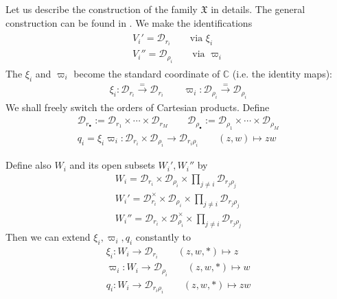 \documentclass[11pt,b5paper,notitlepage]{article}
\theoremstyle{definition}
\theoremstyle{plain}
\newcommand{\mc}{\mathcal}
\newcommand{\wht}{\widehat}
\newcommand{\blt}{\bullet}
\newcommand{\Cbb}{\mathbb C}
\newcommand{\<}{\left\langle}
\renewcommand{\>}{\right\rangle}
\newcommand{\fx}{\mathfrak{X}}
\newcommand{\MD}{\mathcal{D}}
\numberwithin{equation}{section}
\begin{document}
Let us describe the construction of the family $\fx$ in details. The general construction can be found in \cite[Sec. 3]{Gui-sewingconvergence}. We make the identifications
\begin{gather}\label{eq22}
\begin{gathered}
V_i'=\mc D_{r_i}\qquad \text{via }\xi_i\\
V_i''=\mc D_{\rho_i}\qquad \text{via }\varpi_i
\end{gathered}
\end{gather}
The $\xi_i$ and $\varpi_i$ become  the standard coordinate of $\Cbb$ (i.e. the identity maps):
\begin{gather*}
\xi_i:\mc D_{r_i}\xrightarrow{=}\mc D_{r_i}\qquad \varpi_i:\mc D_{\rho_i}\xrightarrow{=}\mc D_{\rho_i}
\end{gather*}
We shall freely switch the orders of Cartesian products. Define 
\begin{gather*}
    \MD_{r_\blt}:=\MD_{r_1}\times \cdots \times \MD_{r_M}\qquad\MD_{\rho_\blt}:=\MD_{\rho_1}\times \cdots \times \MD_{\rho_M}\\
q_i=\xi_i\varpi_i:\MD_{r_i}\times \MD_{\rho_i}\rightarrow \MD_{r_i\rho_i}\qquad (z,w)\mapsto zw
\end{gather*}

Define also $W_i$ and its open subsets $W_i',W_i''$ by
\begin{subequations}\label{eq44}
\begin{gather}
W_i=\MD_{r_i}\times\MD_{\rho_i}\times \prod_{j\ne i} \MD_{r_j\rho_j}\\
W_i'=\MD_{r_i}^\times \times \MD_{\rho_i}\times \prod_{j\ne i} \MD_{r_j\rho_j}\\
W_i''=\MD_{r_i} \times \MD_{\rho_i}^\times\times \prod_{j\ne i} \MD_{r_j\rho_j}
\end{gather}
\end{subequations}
Then we can extend $\xi_i,\varpi_i,q_i$ constantly to 
\begin{subequations}\label{eq29}
\begin{gather}
    \xi_i:W_i\rightarrow \MD_{r_i}  \qquad (z,w,*)\mapsto z\\
    \varpi_i:W_i\rightarrow \MD_{\rho_i}\qquad (z,w,*)\mapsto w\\
q_i:W_i\rightarrow \MD_{r_i\rho_i} \qquad (z,w,*)\mapsto zw
\end{gather}
\end{subequations}
\end{document}
